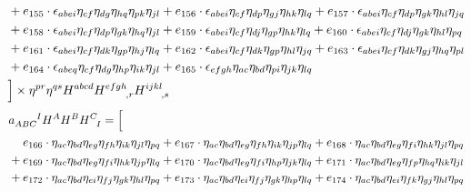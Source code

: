 \begin{itemize}
\begin{align}
    & + e_{155} \cdot \epsilon_{a b e i} \eta_{c f} \eta_{d g} \eta_{h q} \eta_{p k} \eta_{j l} + e_{156} \cdot \epsilon_{a b e i} \eta_{c f} \eta_{d p} \eta_{g j} \eta_{h k} \eta_{l q} + e_{157} \cdot \epsilon_{a b e i} \eta_{c f} \eta_{d p} \eta_{g k} \eta_{h l} \eta_{j q} \nonumber \\
    & + e_{158} \cdot \epsilon_{a b e i} \eta_{c f} \eta_{d p} \eta_{g k} \eta_{h q} \eta_{j l} + e_{159} \cdot \epsilon_{a b e i} \eta_{c f} \eta_{d j} \eta_{g p} \eta_{h k} \eta_{l q} + e_{160} \cdot \epsilon_{a b e i} \eta_{c f} \eta_{d j} \eta_{g k} \eta_{h l} \eta_{p q} \nonumber \\
    & + e_{161} \cdot \epsilon_{a b e i} \eta_{c f} \eta_{d k} \eta_{g p} \eta_{h j} \eta_{l q} + e_{162} \cdot \epsilon_{a b e i} \eta_{c f} \eta_{d k} \eta_{g p} \eta_{h l} \eta_{j q} + e_{163} \cdot \epsilon_{a b e i} \eta_{c f} \eta_{d k} \eta_{g j} \eta_{h q} \eta_{p l} \nonumber \\
    & + e_{164} \cdot \epsilon_{a b e q} \eta_{c f} \eta_{d g} \eta_{h p} \eta_{i k} \eta_{j l} + e_{165} \cdot \epsilon_{e f g h} \eta_{a c} \eta_{b d} \eta_{p i} \eta_{j k} \eta_{l q} \nonumber \\
    & \Big\rbrack \times \eta^{pr} \eta^{qs} H^{abcd} H^{efgh}_{\hphantom{efgh},r} H^{ijkl}_{\hphantom{ijkl},s}
\end{align}
\endgroup
\begingroup
\scriptsize
\allowdisplaybreaks
\begin{align}
    & a_{ABC}^{\hphantom{ABC}I} H^A H^B H^C_{\hphantom CI} = \Big\lbrack \nonumber \\
    & \hphantom{{}+{}} e_{166} \cdot \eta_{a c} \eta_{b d} \eta_{e g} \eta_{f h} \eta_{i k} \eta_{j l} \eta_{p q} + e_{167} \cdot \eta_{a c} \eta_{b d} \eta_{e g} \eta_{f h} \eta_{i k} \eta_{j p} \eta_{l q} + e_{168} \cdot \eta_{a c} \eta_{b d} \eta_{e g} \eta_{f i} \eta_{h k} \eta_{j l} \eta_{p q} \nonumber \\
    & + e_{169} \cdot \eta_{a c} \eta_{b d} \eta_{e g} \eta_{f i} \eta_{h k} \eta_{j p} \eta_{l q} + e_{170} \cdot \eta_{a c} \eta_{b d} \eta_{e g} \eta_{f i} \eta_{h p} \eta_{j k} \eta_{l q} + e_{171} \cdot \eta_{a c} \eta_{b d} \eta_{e g} \eta_{f p} \eta_{h q} \eta_{i k} \eta_{j l} \nonumber \\
    & + e_{172} \cdot \eta_{a c} \eta_{b d} \eta_{e i} \eta_{f j} \eta_{g k} \eta_{h l} \eta_{p q} + e_{173} \cdot \eta_{a c} \eta_{b d} \eta_{e i} \eta_{f j} \eta_{g k} \eta_{h p} \eta_{l q} + e_{174} \cdot \eta_{a c} \eta_{b d} \eta_{e i} \eta_{f k} \eta_{g j} \eta_{h l} \eta_{p q} \nonumber \\

\end{align}
\end{itemize}
